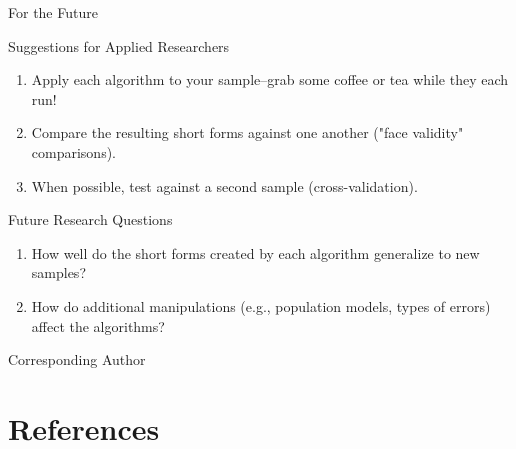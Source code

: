 \documentclass[ignorenonframetext,]{beamer}
\providecommand{\tightlist}{%
  \setlength{\itemsep}{0pt}\setlength{\parskip}{0pt}}
\begin{document}
\begin{frame}{For the Future}
\protect\hypertarget{for-the-future}{}

\begin{block}{Suggestions for Applied Researchers}

\begin{enumerate}[A]
  \item Apply each algorithm to your sample--grab some coffee or tea while they each run!
  \item Compare the resulting short forms against one another ("face validity" comparisons).
  \item When possible, test against a second sample (cross-validation).
\end{enumerate}

\end{block}

\begin{block}{Future Research Questions}

\begin{enumerate}
\tightlist
\item
  How well do the short forms created by each algorithm generalize to
  new samples?
\item
  How do additional manipulations (e.g., population models, types of
  errors) affect the algorithms?
\end{enumerate}

\end{block}

\end{frame}

\begin{frame}{Corresponding Author}
\protect\hypertarget{corresponding-author}{}


\end{frame}

\hypertarget{references}{%
\section{References}\label{references}}
\end{document}
